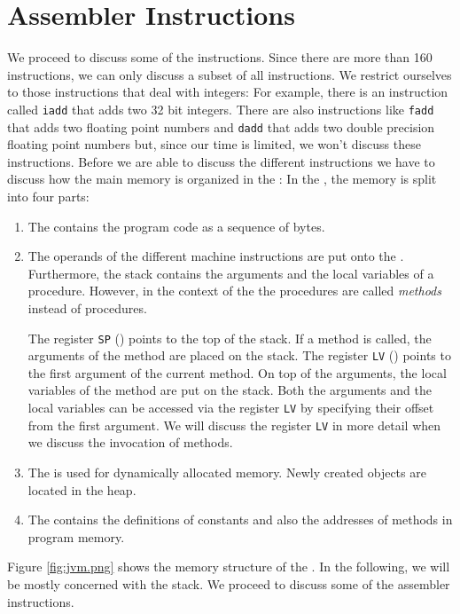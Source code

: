 \section{Assembler Instructions}
We proceed to discuss some of the  instructions.  Since there are more than 160
 instructions, we can only discuss a subset of all instructions.  We restrict ourselves to those
instructions that deal with integers:  For example, there is an instruction called \texttt{iadd} that adds
two 32 bit integers.  There are also instructions like \texttt{fadd} that adds two floating point
numbers and \texttt{dadd} that adds two double precision floating point numbers but, since our time
is limited, we won't discuss these instructions.  Before we are able to discuss the different
instructions we have to discuss how the main memory is organized in the : In the
, the memory is split into four parts: 
\begin{enumerate}
\item The  contains the program code as a sequence of bytes.
\item The operands of the different machine instructions are put onto the .
      Furthermore, the stack contains the arguments and the local variables of a procedure.
      However, in the context of the  the procedures are called \emph{methods} instead
      of procedures.

      The register \texttt{SP} () points to the top of the stack.
      If a method is called, the arguments of the method are placed on the stack.  
      The register \texttt{LV} () points to the first argument of the current  
      method.    On top of the arguments, the local variables of the method are put on the stack.
      Both the arguments and the local variables can be accessed via the register \texttt{LV}
      by specifying their offset from the first argument.
      We will discuss the register \texttt{LV} in more detail when we discuss the invocation of methods. 
\item The  is used for dynamically allocated memory.  Newly created objects are
      located in the heap.
\item The  contains the definitions of constants and also the addresses of
      methods in program memory.
\end{enumerate}
Figure \ref{fig:jvm.png} shows the memory structure of the .
In the following, we will be mostly concerned with the stack.
We proceed to discuss some of the assembler instructions.


